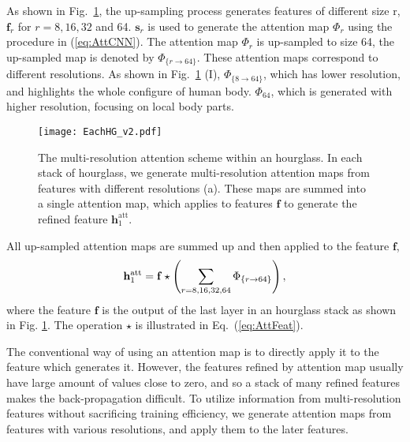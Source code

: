 \documentclass[10pt,twocolumn,letterpaper]{article}
\begin{document}
As shown in Fig.~\ref{fig:multi-resolution}, the up-sampling process generates features of different size r, \ie $\mathbf{f}_{r}$ for $r=8,16,32$ and 64. 
$\mathbf{s}_{r}$ is used to generate the attention map $\Phi_{r}$ using the procedure in (\ref{eq:AttCNN}). 
The attention map $\Phi_{r}$ is up-sampled to size 64, the up-sampled map is denoted by $\Phi_{\{r\rightarrow 64\}}$. 
These attention maps correspond to different resolutions. As shown in Fig.~\ref{fig:multi-resolution} (I), $\Phi_{\{8\rightarrow 64\}}$, which has lower resolution, and highlights the whole configure of human body.  
$\Phi_{64}$, which is generated with higher resolution, focusing on local body parts. 

\begin{figure} 
\begin{center}
\texttt{[image: EachHG\_v2.pdf]}
\end{center}
	\vspace{-1.5em}
   \caption{\small The multi-resolution attention scheme within an hourglass. 
In each stack of hourglass, we generate multi-resolution attention maps from features with different resolutions (a). 
   These maps are summed into a single attention map, which applies to features $\mathbf{f}$ to generate the refined feature $\mathbf{h}_1^{\text{att}}$.  
   }
   	\vspace{-1.5em}
\label{fig:multi-resolution}
\end{figure}

All up-sampled attention maps are summed up and then applied to the feature $\mathbf{f}$, 
\begin{equation}\small\vspace{-0.2em}
   \mathbf{h}_1^{\text{att}} = \mathbf{f} \star \left( \sum_{r=8,16,32,64} \Phi_{\{r \to64\}} \right),
   \label{eq:attCNN2}
\end{equation}
where the feature $\mathbf{f}$ is the output of the last layer in an hourglass stack as shown in Fig. \ref{fig:multi-resolution}. The operation $\star$ is illustrated in Eq.~(\ref{eq:AttFeat}).

The conventional way of using an attention map is to directly apply it to the feature which generates it. 
However, the features refined by attention map usually have large amount of values close to zero, and so a stack of many refined features makes the back-propagation difficult. 
To utilize information from multi-resolution features without sacrificing training efficiency, we generate attention maps from features with various resolutions, and apply them to the later features.
\end{document}
